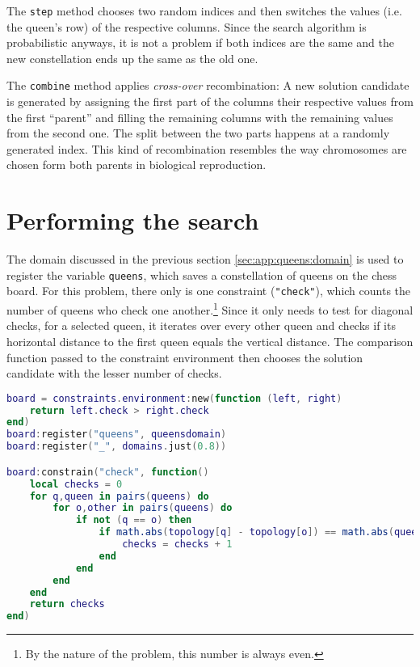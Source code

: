 \begin{appendices}
The \texttt{step} method chooses two random indices and then switches the values (i.e. the queen's row) of the respective columns. Since the search algorithm is probabilistic anyways, it is not a problem if both indices are the same and the new constellation ends up the same as the old one.

The \texttt{combine} method applies \emph{cross-over} recombination: A new solution candidate is generated by assigning the first part of the columns their respective values from the first ``parent'' and filling the remaining columns with the remaining values from the second one. The split between the two parts happens at a randomly generated index. This kind of recombination resembles the way chromosomes are chosen form both parents in biological reproduction.

\section{Performing the search}

The domain discussed in the previous section \ref{sec:app:queens:domain} is used to register the variable \texttt{queens}, which saves a constellation of queens on the chess board. For this problem, there only is one constraint (\texttt{"check"}), which counts the number of queens who check one another.\footnote{By the nature of the problem, this number is always even.} Since it only needs to test for diagonal checks, for a selected queen, it iterates over every other queen and checks if its horizontal distance to the first queen equals the vertical distance. The comparison function passed to the constraint environment then chooses the solution candidate with the lesser number of checks.

\begin{lstlisting}[language=lua, caption={The script \texttt{queens} (part 2, continued from listing \ref{lst:queens1})}, label=lst:queens2, name=lst:queens]
board = constraints.environment:new(function (left, right)
    return left.check > right.check
end)
board:register("queens", queensdomain)
board:register("_", domains.just(0.8))

board:constrain("check", function()
    local checks = 0
    for q,queen in pairs(queens) do
        for o,other in pairs(queens) do
            if not (q == o) then
                if math.abs(topology[q] - topology[o]) == math.abs(queen - other) then
                    checks = checks + 1
                end
            end
        end
    end
    return checks
end)


\end{lstlisting}
\end{appendices}
